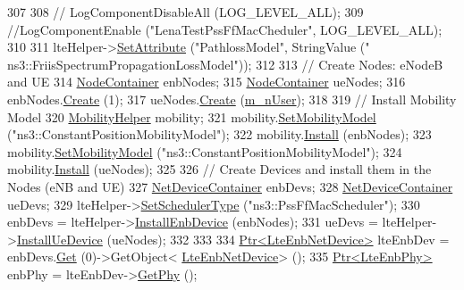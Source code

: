 \begin{DoxyCode}
307 
308 \textcolor{comment}{//   LogComponentDisableAll (LOG\_LEVEL\_ALL);}
309   \textcolor{comment}{//LogComponentEnable ("LenaTestPssFfMacCheduler", LOG\_LEVEL\_ALL);}
310    
311   lteHelper->\hyperlink{classns3_1_1ObjectBase_ac60245d3ea4123bbc9b1d391f1f6592f}{SetAttribute} (\textcolor{stringliteral}{"PathlossModel"}, StringValue (\textcolor{stringliteral}{"
      ns3::FriisSpectrumPropagationLossModel"}));
312 
313   \textcolor{comment}{// Create Nodes: eNodeB and UE}
314   \hyperlink{classns3_1_1NodeContainer}{NodeContainer} enbNodes;
315   \hyperlink{classns3_1_1NodeContainer}{NodeContainer} ueNodes;
316   enbNodes.\hyperlink{classns3_1_1NodeContainer_a787f059e2813e8b951cc6914d11dfe69}{Create} (1);
317   ueNodes.\hyperlink{classns3_1_1NodeContainer_a787f059e2813e8b951cc6914d11dfe69}{Create} (\hyperlink{classLenaPssFfMacSchedulerTestCase1_ad87e97f01764401f397bb0778b2cb424}{m\_nUser});
318 
319   \textcolor{comment}{// Install Mobility Model}
320   \hyperlink{classns3_1_1MobilityHelper}{MobilityHelper} mobility;
321   mobility.\hyperlink{classns3_1_1MobilityHelper_a030275011b6f40682e70534d30280aba}{SetMobilityModel} (\textcolor{stringliteral}{"ns3::ConstantPositionMobilityModel"});
322   mobility.\hyperlink{classns3_1_1MobilityHelper_a07737960ee95c0777109cf2994dd97ae}{Install} (enbNodes);
323   mobility.\hyperlink{classns3_1_1MobilityHelper_a030275011b6f40682e70534d30280aba}{SetMobilityModel} (\textcolor{stringliteral}{"ns3::ConstantPositionMobilityModel"});
324   mobility.\hyperlink{classns3_1_1MobilityHelper_a07737960ee95c0777109cf2994dd97ae}{Install} (ueNodes);
325 
326   \textcolor{comment}{// Create Devices and install them in the Nodes (eNB and UE)}
327   \hyperlink{classns3_1_1NetDeviceContainer}{NetDeviceContainer} enbDevs;
328   \hyperlink{classns3_1_1NetDeviceContainer}{NetDeviceContainer} ueDevs;
329   lteHelper->\hyperlink{classns3_1_1LteHelper_a8f86e55b8b80a81732c4b2df00fb25d5}{SetSchedulerType} (\textcolor{stringliteral}{"ns3::PssFfMacScheduler"});
330   enbDevs = lteHelper->\hyperlink{classns3_1_1LteHelper_a5e009ad35ef85f46b5a6099263f15a03}{InstallEnbDevice} (enbNodes);
331   ueDevs = lteHelper->\hyperlink{classns3_1_1LteHelper_ac9cd932d7de92811cfa953c2e3b2fc9f}{InstallUeDevice} (ueNodes);
332 
333 
334   \hyperlink{classns3_1_1Ptr}{Ptr<LteEnbNetDevice>} lteEnbDev = enbDevs.\hyperlink{classns3_1_1NetDeviceContainer_a677d62594b5c9d2dea155cc5045f4d0b}{Get} (0)->GetObject<
      \hyperlink{classns3_1_1LteEnbNetDevice}{LteEnbNetDevice}> ();
335   \hyperlink{classns3_1_1Ptr}{Ptr<LteEnbPhy>} enbPhy = lteEnbDev->\hyperlink{classns3_1_1LteEnbNetDevice_a58db72130e0740f16a5e03b22e4a10a4}{GetPhy} ();

\end{DoxyCode}
